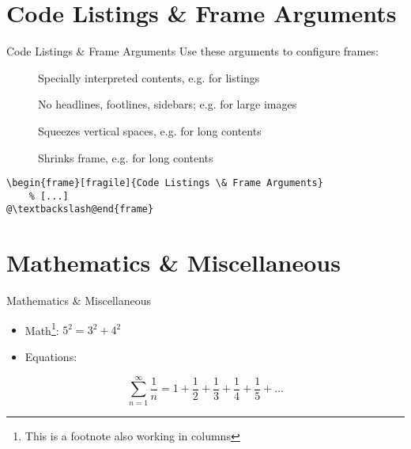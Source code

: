 \documentclass{beamer}
\begin{document}
\section{Code Listings \& Frame Arguments}
\begin{frame}[fragile]{Code Listings \& Frame Arguments}
	Use these arguments to configure frames:
	\begin{description}
		\item[\hfill]
		Specially interpreted contents, e.g. for listings
		\item[\hfill]
		No headlines, footlines, sidebars; e.g. for large images
		\item[\hfill]
		Squeezes vertical spaces, e.g. for long contents
		\item[\hfill]
		Shrinks frame, e.g. for long contents
	\end{description}
	\begin{lstlisting}[caption={Frame Options}]
\begin{frame}[fragile]{Code Listings \& Frame Arguments}
	% [...]
@\textbackslash@end{frame}
	\end{lstlisting}
\end{frame}

\section{Mathematics \& Miscellaneous}
\begin{frame}{Mathematics \& Miscellaneous}
	\begin{itemize}
		\item Math\footnote[frame]{This is a footnote also working in columns}: $5^{2}=3^{2}+4^{2}$
		\item Equations:
	\end{itemize}
	\begin{equation}
		\sum_{n = 1}^{\infty} \frac{1}{n} = 1 + \frac{1}{2} + \frac{1}{3} + \frac{1}{4} + \frac{1}{5} + \dots 
	\end{equation}
\end{frame}
\end{document}
